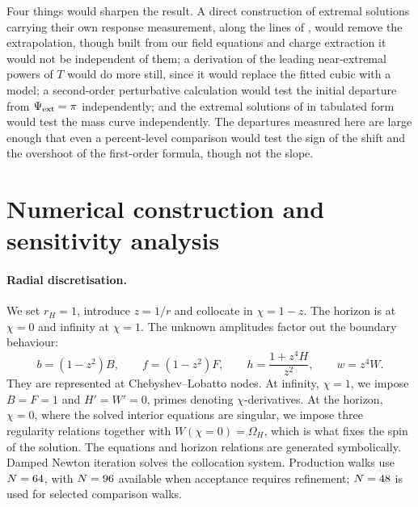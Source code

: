 \documentclass[11pt,a4paper]{article}
\begin{document}
Four things would sharpen the result. A direct construction of extremal
solutions carrying their own response measurement, along the lines of
\cite{Kleihaus:2023zzs}, would remove the extrapolation, though built from
our field equations and charge extraction it would not be independent of
them; a derivation of the leading near-extremal powers of $T$ would do more
still, since it would replace the fitted cubic with a model; a second-order
perturbative calculation would test the initial departure from
$\Psi_{\mathrm{ext}}=\pi$ independently; and the extremal solutions of
\cite{Kleihaus:2023zzs} in tabulated form would test the mass curve
independently. The departures measured here are large enough that even a
percent-level comparison would test the sign of the shift and the overshoot
of the first-order formula, though not the slope.

\appendix
\section{Numerical construction and sensitivity analysis}
\label{app:numerics}

\paragraph{Radial discretisation.}
We set $r_H=1$, introduce $z=1/r$ and collocate in $\chi=1-z$.
The horizon is at $\chi=0$ and infinity at $\chi=1$.
The unknown amplitudes factor out the boundary behaviour:
\begin{equation*}
 b=(1-z^2)B,\qquad f=(1-z^2)F,\qquad
 h=\frac{1+z^4H}{z^2},\qquad w=z^4W.
\end{equation*}
They are represented at Chebyshev--Lobatto nodes.
At infinity, $\chi=1$, we impose $B=F=1$ and $H'=W'=0$, primes denoting
$\chi$-derivatives. At the horizon, $\chi=0$, where the solved interior
equations are singular, we impose three regularity relations together with
$W(\chi=0)=\Omega_H$, which is what fixes the spin of the solution.
The equations and horizon relations are generated symbolically.
Damped Newton iteration solves the collocation system.
Production walks use $N=64$, with
$N=96$ available when acceptance requires refinement;
$N=48$ is used for selected comparison walks.
\end{document}
